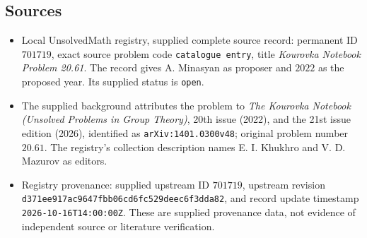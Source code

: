 \documentclass[11pt]{article}
\begin{document}
\subsection{Sources}
\begin{itemize}
\item Local UnsolvedMath registry, supplied complete source record: permanent ID \(701719\), exact source problem code \texttt{catalogue entry}, title \emph{Kourovka Notebook Problem 20.61}. The record gives A. Minasyan as proposer and \(2022\) as the proposed year. Its supplied status is \texttt{open}.
\item The supplied background attributes the problem to \emph{The Kourovka Notebook (Unsolved Problems in Group Theory)}, 20th issue (2022), and the 21st issue edition (2026), identified as \texttt{arXiv:1401.0300v48}; original problem number \(20.61\). The registry's collection description names E. I. Khukhro and V. D. Mazurov as editors.
\item Registry provenance: supplied upstream ID \(701719\), upstream revision \texttt{d371ee917ac9647fbb06cd6fc529deec6f3dda82}, and record update timestamp \texttt{2026-10-16T14:00:00Z}. These are supplied provenance data, not evidence of independent source or literature verification.
\end{itemize}
\end{document}
